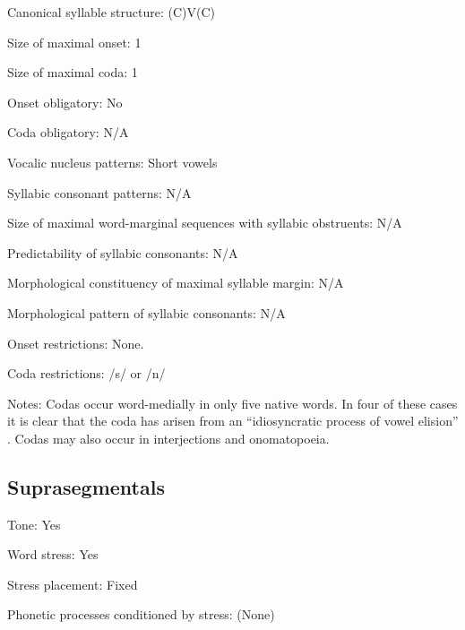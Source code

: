 {\begin{appendixdesc}
\item[Canonical syllable structure:] (C)V(C) \citep[30--32]{Guillaume2008}

\item[Size of maximal onset:] 1

\item[Size of maximal coda:] 1

\item[Onset obligatory:] No

\item[Coda obligatory:] N/A

\item[Vocalic nucleus patterns:] Short vowels

\item[Syllabic consonant patterns:] N/A

\item[Size of maximal word-marginal sequences with syllabic obstruents:] N/A

\item[Predictability of syllabic consonants:] N/A

\item[Morphological constituency of maximal syllable margin:] N/A

\item[Morphological pattern of syllabic consonants:] N/A

\item[Onset restrictions:] None.

\item[Coda restrictions:] /s/ or /n/

\item[Notes:] Codas occur word-medially in only five native words. In four of these cases it is clear that the coda has arisen from an “idiosyncratic process of vowel elision” \citep[31]{Guillaume2008}. Codas may also occur in interjections and onomatopoeia.
\end{appendixdesc}
\subsection*{Suprasegmentals}
\begin{appendixdesc}
\item[Tone:] Yes

\item[Word stress:] Yes

\item[Stress placement:] Fixed

\item[Phonetic processes conditioned by stress:] (None)


\end{appendixdesc}}
